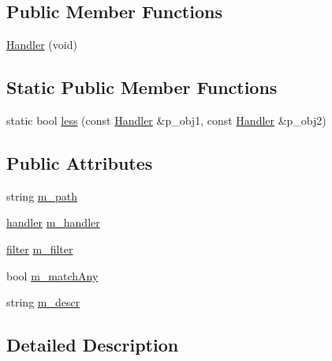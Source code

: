 \subsection*{Public Member Functions}
\begin{DoxyCompactItemize}
\item 
\hyperlink{classxtd_1_1network_1_1http_1_1Server_1_1Handler_a509777bdc769cabb23f04728e745b823}{Handler} (void)
\end{DoxyCompactItemize}
\subsection*{Static Public Member Functions}
\begin{DoxyCompactItemize}
\item 
static bool \hyperlink{classxtd_1_1network_1_1http_1_1Server_1_1Handler_a91c38afd6870731fe9f1b79d2cfda19f}{less} (const \hyperlink{classxtd_1_1network_1_1http_1_1Server_1_1Handler}{Handler} \&p\+\_\+obj1, const \hyperlink{classxtd_1_1network_1_1http_1_1Server_1_1Handler}{Handler} \&p\+\_\+obj2)
\end{DoxyCompactItemize}
\subsection*{Public Attributes}
\begin{DoxyCompactItemize}
\item 
string \hyperlink{classxtd_1_1network_1_1http_1_1Server_1_1Handler_aaea3487ea9687e61c40453d90841b223}{m\+\_\+path}
\item 
\hyperlink{structxtd_1_1network_1_1http_1_1Server_1_1Handler_1_1handler}{handler} \hyperlink{classxtd_1_1network_1_1http_1_1Server_1_1Handler_a4dfed2def9b251595d4ee176c106882f}{m\+\_\+handler}
\item 
\hyperlink{structxtd_1_1network_1_1http_1_1Server_1_1Handler_1_1filter}{filter} \hyperlink{classxtd_1_1network_1_1http_1_1Server_1_1Handler_a95854563aaa6e9c7fcced63d351e47a3}{m\+\_\+filter}
\item 
bool \hyperlink{classxtd_1_1network_1_1http_1_1Server_1_1Handler_a7605921b1ffffb66376920cfa6ebcb08}{m\+\_\+match\+Any}
\item 
string \hyperlink{classxtd_1_1network_1_1http_1_1Server_1_1Handler_aae46aaaf81c803b4ac6dd1a5b60feb36}{m\+\_\+descr}
\end{DoxyCompactItemize}


\subsection{Detailed Description}
